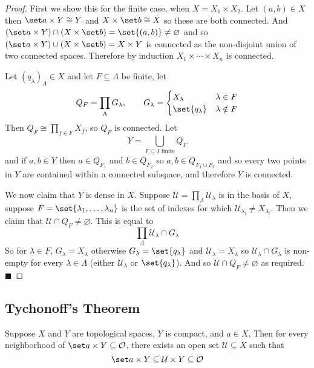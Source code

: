 \documentclass[10pt]{article}
\def\qed{\hskip1cm\penalty-100\hbox{}\hfill$\blacksquare$}
\def\mU{\mathcal{U}}
\def\mO{\mathcal{O}}
\begin{document}
\begin{proof}

    First we show this for the finite case, when $X=X_1\times X_2$.
    Let $(a,b)\in X$ then $\set a\times Y\cong Y$ and $X\times\set b\cong X$ so these are both connected.
    And $(\set a\times Y)\cap(X\times\set b)=\set{(a,b)}\neq\varnothing$ and so $(\set a\times Y)\cup(X\times\set b)=X\times Y$ is connected as the non-disjoint union of two connected spaces.
    Therefore by induction $X_1\times\cdots\times X_n$ is connected.

    Let $(q_\lambda)_\Lambda\in X$ and let $F\subseteq\Lambda$ be finite, let
    \[ Q_F = \prod_\Lambda G_\lambda,\qquad G_\lambda = \begin{cases} X_\lambda & \lambda\in F \\ \set{q_\lambda} & \lambda\notin F \end{cases} \]
    Then $Q_F\cong\prod_{f\in F}X_f$, so $Q_F$ is connected.
    Let
    \[ Y = \bigcup_{F\subseteq I\text{ finite}}Q_F \]
    and if $a,b\in Y$ then $a\in Q_{F_1}$ and $b\in Q_{F_2}$ so $a,b\in Q_{F_1\cup F_2}$ and so every two points in $Y$ are contained within a connected subspace, and therefore $Y$ is connected.

    We now claim that $Y$ is dense in $X$.
    Suppose $\mU=\prod_\Lambda\mU_\lambda$ is in the basis of $X$, suppose $F=\set{\lambda_1,\dots,\lambda_n}$ is the set of indexes for which $\mU_{\lambda_i}\neq X_{\lambda_i}$.
    Then we claim that $\mU\cap Q_F\neq\varnothing$.
    This is equal to
    \[ \prod_\Lambda \mU_\lambda\cap G_\lambda \]
    So for $\lambda\in F$, $G_\lambda=X_\lambda$ otherwise $G_\lambda=\set{q_\lambda}$ and $\mU_\lambda=X_\lambda$ so $\mU_\lambda\cap G_\lambda$ is non-empty for every $\lambda\in\Lambda$ (either
    $\mU_\lambda$ or $\set{q_\lambda}$).
    And so $\mU\cap Q_F\neq\varnothing$ as required.
    \qed

\end{proof}

\subsection{Tychonoff's Theorem}

\begin{lemm*}

    Suppose $X$ and $Y$ are topological spaces, $Y$ is compact, and $a\in X$.
    Then for every neighborhood of $\set a\times Y\subseteq\mO$, there exists an open set $\mU\subseteq X$ such that
    \[ \set a\times Y\subseteq \mU\times Y\subseteq \mO \]

\end{lemm*}
\end{document}
